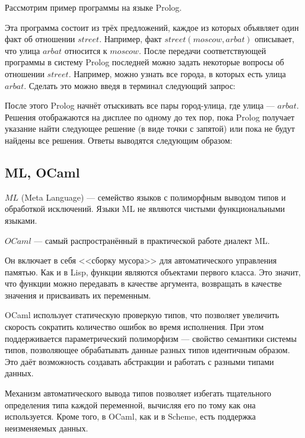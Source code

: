         Рассмотрим пример программы на языке Prolog.

        

        Эта программа состоит из трёх предложений, каждое из которых объявляет один факт об отношении $street$.
        Например, факт $street( moscow, arbat )$ описывает, что улица $arbat$ относится к $moscow$.
        После передачи соответствующей программы в систему Prolog последней можно задать некоторые вопросы об отношении $street$.
        Например, можно узнать все города, в которых есть улица $arbat$.
        Сделать это можно введя в терминал следующий запрос:

        

        После этого Prolog начнёт отыскивать все пары город-улица, где улица --- $arbat$.
        Решения отображаются на дисплее по одному до тех пор, пока Prolog получает указание найти следующее решение (в виде точки с запятой) или пока не будут найдены все решения\cite{prolog_bratko}.
        Ответы выводятся следующим образом:

        

    \subsection{ML, OCaml}
        $ML$ (Meta Language) --- семейство языков с полиморфным выводом типов и обработкой исключений.
        Языки ML не являются чистыми функциональными языками.
        
        $OCaml$ --- самый распространённый в практической работе диалект ML.

        Он включает в себя <<сборку мусора>> для автоматического управления памятью.
        Как и в Lisp, функции являются объектами первого класса.
        Это значит, что функции можно передавать в качестве аргумента, возвращать в качестве значения и присваивать их переменным.

        OCaml использует статическую проверкую типов, что позволяет увеличить скорость сократить количество ошибок во время исполнения.
        При этом поддерживается параметрический полиморфизм --- свойство семантики системы типов, позволяющее обрабатывать данные разных типов идентичным образом.
        Это даёт возможность создавать абстракции и работать с разными типами данных.

        Механизм автоматического вывода типов позволяет избегать тщательного определения типа каждой переменной, вычисляя его по тому как она используется.
        Кроме того, в OCaml, как и в Scheme, есть поддержка неизменяемых данных.


